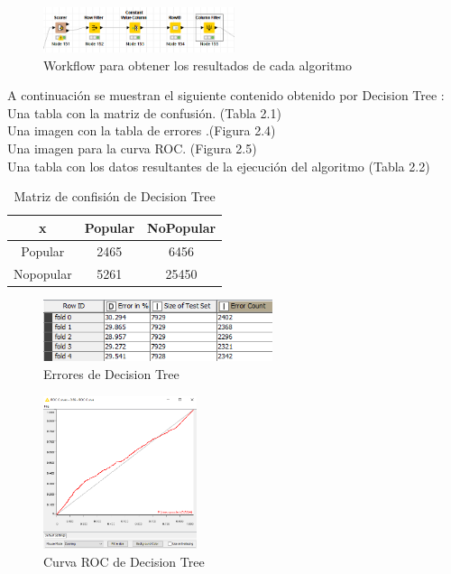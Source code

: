 	\begin{figure}[htb]
		\centering
		\includegraphics[width=0.5\textwidth]{./imagenes/35}
		\caption{Workflow para obtener los resultados de cada algoritmo} \label{fig:35}
	\end{figure}

	A continuación se muestran el siguiente contenido obtenido por Decision Tree :	\\
	Una tabla con la matriz de confusión. (Tabla 2.1) \\
	Una imagen con la tabla de errores .(Figura 2.4) \\
	Una imagen para la curva ROC. (Figura 2.5)	\\
	Una tabla con los datos resultantes de la ejecución del algoritmo (Tabla 2.2)\\

	\begin{table}[htbp]
		\begin{center}
			\begin{tabular}{ | c | c | c | }
				\hline
				x & Popular & NoPopular \\ \hline
				Popular & 2465 & 6456 \\ \hline 
				Nopopular & 5261 & 25450 \\ \hline
			  \end{tabular}
			\caption{Matriz de confisión de Decision Tree}
			\label{tabla:sencilla}
		\end{center}
	\end{table}

	\begin{figure}[htb]
		\centering
		\includegraphics[width=0.6\textwidth]{./imagenes/8}
		\caption{Errores de Decision Tree} \label{fig:1}
	\end{figure}

	\begin{figure}[htb]
		\centering
		\includegraphics[width=0.4\textwidth]{./imagenes/9}
		\caption{Curva ROC de Decision Tree} \label{fig:1}
	\end{figure}

